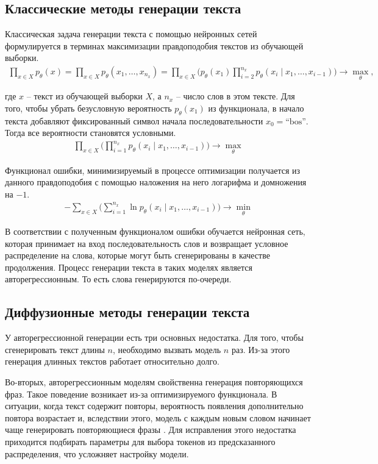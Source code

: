 \documentclass[12pt,a4paper]{article}
\begin{document}
\subsection{Классические методы генерации текста}

Классическая задача генерации текста с помощью нейронных сетей формулируется в терминах максимизации правдоподобия текстов из обучающей выборки.
\begin{align}
\prod_{x\in X} p_\theta(x) = \prod_{x\in X} p_\theta(x_1, \dots, x_{n_x}) = \prod_{x\in X} \bigg(p_\theta(x_1) \prod_{i=2}^{n_x} p_\theta(x_i \mid x_1, \dots, x_{i-1})\bigg) \to \max_\theta,
\end{align}

где $x$ -- текст из обучающей выборки $X$, а $n_x$ -- число слов в этом тексте. Для того, чтобы убрать безусловную вероятность $p_\theta(x_1)$ из функционала, в начало текста добавляют фиксированный символ начала последовательности $x_0 = \text{``bos''}$. Тогда все вероятности становятся условными.
\begin{align}
\prod_{x\in X} \bigg(\prod_{i=1}^{n_x} p_\theta(x_i \mid x_1, \dots, x_{i-1})\bigg) \to \max_\theta
\end{align}

Функционал ошибки, минимизируемый в процессе оптимизации получается из данного правдоподобия с помощью наложения на него логарифма и домножения на $-1$.
\begin{align}
-\sum_{x\in X} \bigg(\sum_{i=1}^{n_x} \ln p_\theta(x_i \mid x_1, \dots, x_{i-1})\bigg) \to \min_\theta
\end{align}

В соответствии с полученным функционалом ошибки обучается нейронная сеть, которая принимает на вход последовательность слов и возвращает условное распределение на слова, которые могут быть сгенерированы в качестве продолжения. Процесс генерации текста в таких моделях является авторегрессионным. То есть слова генерируются по-очереди.

\subsection{Диффузионные методы генерации текста}

У авторегрессионной генерации есть три основных недостатка. Для того, чтобы сгенерировать текст длины $n$, необходимо вызвать модель $n$ раз. Из-за этого генерация длинных текстов работает относительно долго.

Во-вторых, авторегрессионным моделям свойственна генерация повторяющихся фраз. Такое поведение возникает из-за оптимизируемого функционала. В ситуации, когда текст содержит повторы, вероятность появления дополнительно повтора возрастает и, вследствии этого, модель с каждым новым словом начинает чаще генерировать повторяющиеся фразы \cite{theoretical_repetitions}. Для исправления этого недостатка приходится подбирать параметры для выбора токенов из предсказанного распределения, что усложняет настройку модели. 
\end{document}

